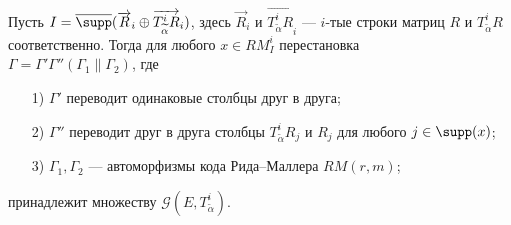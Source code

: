 \begin{proposition}\label{prop24}
Пусть
$I=\overline{\supp}(\overrightarrow{R}_i\oplus\overrightarrow{T^i_{\widetilde\alpha}R}_i)$,
здесь $\overrightarrow{R}_i$ и
$\overrightarrow{T^i_{\widetilde\alpha}R}_i$ --- $i$-тые строки
матриц $R$ и $T^i_{\widetilde\alpha}R$ соответственно. Тогда для
любого $x\in RM^i_I$ перестановка\\
$\Gamma=\Gamma'\Gamma''(\Gamma_1\|\Gamma_2)$, где
\begin{itemize}
\item[1)] $\Gamma'$ переводит одинаковые столбцы друг в друга;
\item[2)] $\Gamma''$ переводит друг в друга  столбцы $T^i_{\widetilde\alpha}R_j$
 и $R_j$ для любого $j\in \supp(x)$;
 \item[3)] $\Gamma_1,\Gamma_2$ --- автоморфизмы кода Рида--Маллера
 $RM(r,m)$;
\end{itemize}
принадлежит множеству $\mathcal G(E,T^i_{\widetilde\alpha})$.
\end{proposition}
